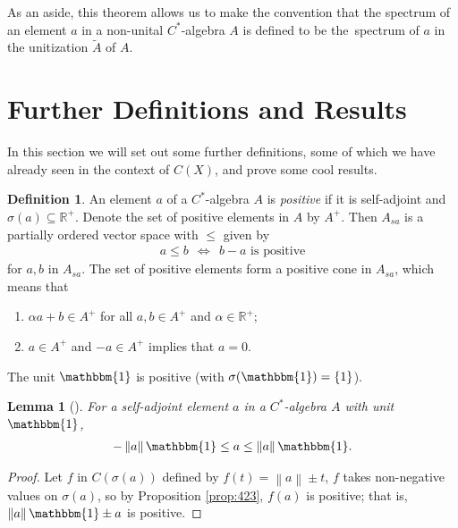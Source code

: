 \documentclass[11pt,a4paper]{report}
\theoremstyle{plain}
\newtheorem{lemma}{Lemma}
\theoremstyle{definition}
\newtheorem{defn}{Definition}
\newcommand{\1}{\mathbbm{1}}
\newcommand{\R}{\mathbb{R}}
\newcommand{\CX}{C(X)}
\newcommand{\spec}[1]{\sigma(#1)}
\begin{document}
As an aside, this theorem allows us to make the convention that the spectrum of 
an element $a$ in a non-unital $C^\ast$-algebra $A$ is defined to be 
the~spectrum of $a$ in the unitization $\tilde A$ of $A$.





\section{Further Definitions and Results}
In this section we will set out some further definitions, some of which we have 
already seen in the context of $\CX$, and prove some cool results.


\begin{defn}
	An element $a$ of a $C^\ast$-algebra $A$ is \emph{positive} if it is 
	self-adjoint and $\spec a\subseteq \R^+$. Denote the set of positive elements 
	in $A$ by $A^+$. Then $A_{sa}$ is a partially ordered vector space with $\leq$ 
	given by
	\begin{align*}
		a\leq b ~~\iff~~ b-a \mbox{ is positive}
	\end{align*}
	for $a,b$ in $A_{sa}$.
	The set of positive elements form a positive cone in $A_{sa}$, which means that 
	\begin{enumerate}
		\item 	$\alpha a+b\in A^+$ for all $a,b \in A^+$ and $\alpha\in \R^+$;
		\item	$a\in A^+$ and $-a\in A^+$ implies that $a=0$.
	\end{enumerate}
\end{defn}

The unit $\1$ is positive (with $\spec \1 = \left\{1\right\}$). 

\begin{lemma}[{\cite[4.2.3(ii)]{kadison83}}]\label{lemma:423}
	For a self-adjoint element $a$ in a $C^\ast$-algebra $A$ with unit $\1$, 
	\begin{align*}
		-\left\|a\right\|\1 \leq a\leq\left\|a\right\|\1.
	\end{align*}
\end{lemma}
\begin{proof}
	Let $f$ in $C(\spec a)$ defined by $f(t) = \left\|a\right\| \pm t$, $f$ takes 
	non-negative values on $\spec a$, so by Proposition \ref{prop:423}, $f(a)$ is 
	positive; that is, $\left\|a\right\|\1 \pm a$ is positive.

\end{proof}
	
\end{document}

